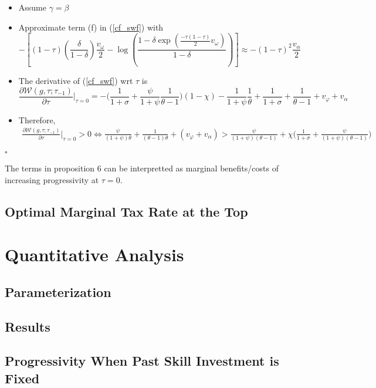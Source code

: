 \documentclass{article}
\begin{document}
\begin{itemize}
\item Assume $\gamma = \beta$
\item Approximate term (f) in (\ref{cf_swf}) with 
$$
-[(1-\tau)(\frac{\delta}{1 - \delta})\frac{v_{\omega}}{2} - \log(\frac{1-\delta \exp(\frac{-\tau(1-\tau)}{2}v_\omega)}{1-\delta})] 
\approx
-(1-\tau)^2\frac{v_\alpha}{2}
$$
\item The derivative of (\ref{cf_swf}) wrt $\tau$ is
$$
\frac{\partial \mathcal{W}(g, \tau; \tau_{-1})}{\partial \tau} |_{\tau = 0} = - \Bigg( \frac{1}{1+\sigma} + \frac{\psi}{1+\psi}\frac{1}{\theta-1} \Bigg)(1-\chi) - \frac{1}{1 +\psi}\frac{1}{\theta} + \frac{1}{1+\sigma} + \frac{1}{\theta - 1} + v_\varphi + v_\alpha
$$
\item Therefore,
\begin{align}
\frac{\partial \mathcal{W}(g, \tau; \tau_{-1})}{\partial \tau} |_{\tau = 0} > 0 \iff
\frac{\psi}{(1+\psi)\theta}
+ 
\frac{1}{(\theta -1 )\theta} 
+ 
(v_\varphi + v_\alpha)
> 
\frac{\psi}{(1+\psi)(\theta-1)} 
+ 
\chi \Bigg(\frac{1}{1+\sigma} + \frac{\psi}{(1+\psi)(\theta -1)}\Bigg)
\end{align}
\end{itemize}
$\square$

\bigskip

The terms in proposition 6 can be interpretted as marginal benefits/costs of increasing progressivity at $\tau = 0$.

\subsection{Optimal Marginal Tax Rate at the Top}

\section{Quantitative Analysis}

\subsection{Parameterization}

\subsection{Results}

\subsection{Progressivity When Past Skill Investment is Fixed}
\end{document}
